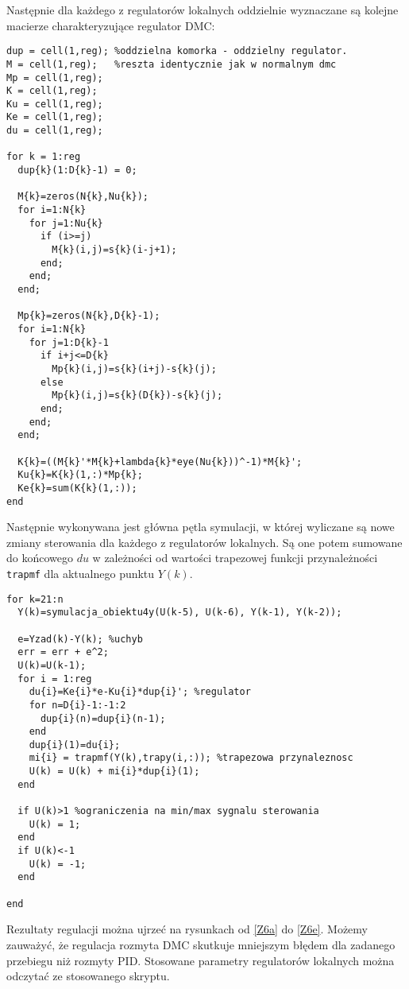 Następnie dla każdego z regulatorów lokalnych oddzielnie wyznaczane są kolejne macierze charakteryzujące regulator DMC:

\begin{lstlisting}[style=Matlab-editor]
dup = cell(1,reg); %oddzielna komorka - oddzielny regulator. 
M = cell(1,reg);   %reszta identycznie jak w normalnym dmc
Mp = cell(1,reg);
K = cell(1,reg);
Ku = cell(1,reg);
Ke = cell(1,reg);
du = cell(1,reg);

for k = 1:reg
  dup{k}(1:D{k}-1) = 0;

  M{k}=zeros(N{k},Nu{k});
  for i=1:N{k}
    for j=1:Nu{k}
      if (i>=j)
        M{k}(i,j)=s{k}(i-j+1);
      end;
    end;
  end;

  Mp{k}=zeros(N{k},D{k}-1);
  for i=1:N{k}
    for j=1:D{k}-1
      if i+j<=D{k}
        Mp{k}(i,j)=s{k}(i+j)-s{k}(j);
      else
        Mp{k}(i,j)=s{k}(D{k})-s{k}(j);
      end;      
    end;
  end;

  K{k}=((M{k}'*M{k}+lambda{k}*eye(Nu{k}))^-1)*M{k}';
  Ku{k}=K{k}(1,:)*Mp{k};
  Ke{k}=sum(K{k}(1,:));
end
\end{lstlisting}

Następnie wykonywana jest główna pętla symulacji, w której wyliczane są nowe zmiany sterowania dla każdego z regulatorów lokalnych. Są one potem sumowane do końcowego $ du $ w zależności od wartości trapezowej funkcji przynależności \verb|trapmf| dla aktualnego punktu $ Y(k) $.

\begin{lstlisting}[style=Matlab-editor]
%glowna petla
for k=21:n 
  Y(k)=symulacja_obiektu4y(U(k-5), U(k-6), Y(k-1), Y(k-2)); 

  e=Yzad(k)-Y(k); %uchyb
  err = err + e^2;
  U(k)=U(k-1);
  for i = 1:reg
    du{i}=Ke{i}*e-Ku{i}*dup{i}'; %regulator
    for n=D{i}-1:-1:2
      dup{i}(n)=dup{i}(n-1);
    end
    dup{i}(1)=du{i};
    mi{i} = trapmf(Y(k),trapy(i,:)); %trapezowa przynaleznosc
    U(k) = U(k) + mi{i}*dup{i}(1);
  end

  if U(k)>1 %ograniczenia na min/max sygnalu sterowania
    U(k) = 1;
  end
  if U(k)<-1
    U(k) = -1;
  end

end
\end{lstlisting}

Rezultaty regulacji można ujrzeć na rysunkach od \ref{Z6a} do \ref{Z6e}. Możemy zauważyć, że regulacja rozmyta DMC skutkuje mniejszym błędem dla zadanego przebiegu niż rozmyty PID. Stosowane parametry regulatorów lokalnych można odczytać ze stosowanego skryptu.

